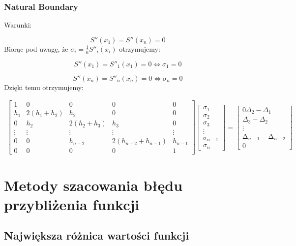 \documentclass{article}
\begin{document}
\subsubsection{Natural Boundary}

Warunki:

\[S''(x_1) = S''(x_n) = 0\]
\noindent
Biorąc pod uwagę, że \(\sigma_i = \frac{1}{6}S''_i(x_i)\) otrzymujemy:

\[S''(x_1) = S''_1(x_1) = 0 \Leftrightarrow \sigma_1 = 0\]

\[S''(x_n) = S''_n(x_n) = 0 \Leftrightarrow \sigma_n = 0\]
\noindent
Dzięki temu otrzymujemy:

\begin{gather*}
\begin{bmatrix}
1 & 0 & 0 & 0 & 0 \\
h_1 & 2(h_1+h_2) & h_2 & 0 & 0 \\
0 & h_2 & 2(h_2+h_3) & h_3 & 0 \\
\vdots & \vdots & \vdots & \vdots & \vdots \\
0 & 0 & h_{n-2} & 2(h_{n-2} + h_{n-1}) & h_{n-1} \\
0 & 0 & 0 & 0 & 1 
\end{bmatrix}
\begin{bmatrix}
\sigma_1 \\
\sigma_2 \\
\sigma_3 \\
\vdots \\
\sigma_{n-1} \\
\sigma_n 
\end{bmatrix}
=
\begin{bmatrix}
0 
\Delta_2 - \Delta_1 \\
\Delta_3 - \Delta_2 \\
\vdots \\
\mathrm{\Delta}_{n-1}^{} - \mathrm{\Delta}_{n-2}^{} \\
0
\end{bmatrix}
\end{gather*}

\section{Metody szacowania błędu przybliżenia funkcji}

\subsection{Największa różnica wartości funkcji}
\end{document}
